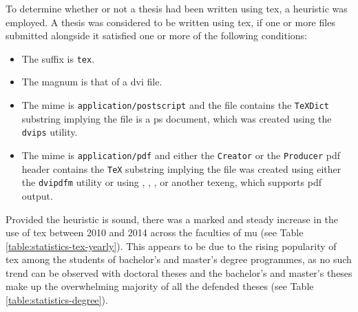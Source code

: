 To determine whether or not a thesis had been written using \gls{tex}, a heuristic was employed. A thesis was considered to be written using \gls{tex}, if one or more files submitted alongside it satisfied one or more of the following conditions:

\begin{itemize}
  \item The suffix is \texttt{tex}.
  \item The \gls{magnum} is that of a \acrshort{dvi} file.
  \item The \gls{mime} is \texttt{application/postscript} and the file contains the \texttt{TeXDict} substring implying the file is a \gls{ps} document, which was created using the \texttt{dvips} utility.
  \item The \gls{mime} is \texttt{application/pdf} and either the \texttt{Creator} or the \texttt{Producer} \gls{pdf} header contains the \texttt{TeX} substring implying the file was created using either the \texttt{dvipdfm} utility or using , , ,  or another \gls{texeng}, which supports \gls{pdf} output.
\end{itemize}

Provided the heuristic is sound, there was a marked and steady increase in the use of \gls{tex} between 2010 and 2014 across the faculties of \gls{mu} (see Table \ref{table:statistics-tex-yearly}). This appears to be due to the rising popularity of \gls{tex} among the students of bachelor's and master's degree programmes, as no such trend can be observed with doctoral theses and the bachelor's and master's theses make up the overwhelming majority of all the defended theses (see Table \ref{table:statistics-degree}).

